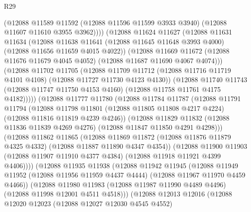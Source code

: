\begin{lexlean}{R29}
\begin{coremodule}
              (@12088
                @11589
                @11592
                (@12088 @11596 @11599 @3933 @3940)
                (@12088 @11607 @11610 @3955 @3962))))
          (@12088
            @11624
            @11627
            (@12088
              @11631
              @11634
              (@12088
                @11638
                @11641
                (@12088 @11645 @11648 @3993 @4000)
                (@12088 @11656 @11659 @4015 @4022))
              (@12088
                @11669
                @11672
                (@12088 @11676 @11679 @4045 @4052)
                (@12088 @11687 @11690 @4067 @4074)))
            (@12088
              @11702
              @11705
              (@12088
                @11709
                @11712
                (@12088 @11716 @11719 @4101 @4108)
                (@12088 @11727 @11730 @4123 @4130))
              (@12088
                @11740
                @11743
                (@12088 @11747 @11750 @4153 @4160)
                (@12088 @11758 @11761 @4175 @4182)))))
        (@12088
          @11777
          @11780
          (@12088
            @11784
            @11787
            (@12088
              @11791
              @11794
              (@12088
                @11798
                @11801
                (@12088 @11805 @11808 @4217 @4224)
                (@12088 @11816 @11819 @4239 @4246))
              (@12088
                @11829
                @11832
                (@12088 @11836 @11839 @4269 @4276)
                (@12088 @11847 @11850 @4291 @4298)))
            (@12088
              @11862
              @11865
              (@12088
                @11869
                @11872
                (@12088 @11876 @11879 @4325 @4332)
                (@12088 @11887 @11890 @4347 @4354))
              (@12088
                @11900
                @11903
                (@12088 @11907 @11910 @4377 @4384)
                (@12088 @11918 @11921 @4399 @4406))))
          (@12088
            @11935
            @11938
            (@12088
              @11942
              @11945
              (@12088
                @11949
                @11952
                (@12088 @11956 @11959 @4437 @4444)
                (@12088 @11967 @11970 @4459 @4466))
              (@12088
                @11980
                @11983
                (@12088 @11987 @11990 @4489 @4496)
                (@12088 @11998 @12001 @4511 @4518)))
            (@12088
              @12013
              @12016
              (@12088
                @12020
                @12023
                (@12088 @12027 @12030 @4545 @4552)

\end{coremodule}
\end{lexlean}
